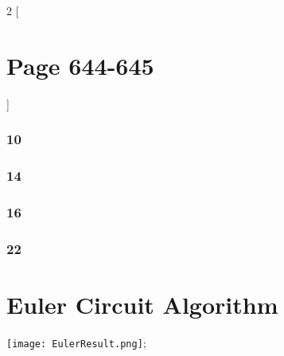 \documentclass[12pt]{article}
\begin{document}
  \begin{multicols}{2}
    [\part*{Page 644-645}]
    \section*{10}
    \section*{14}
    \section*{16}
    \section*{22}
  \end{multicols}

  \part*{Euler Circuit Algorithm}
    
    \begin{center}
      \texttt{[image: EulerResult.png]};
    \end{center}
\end{document}
